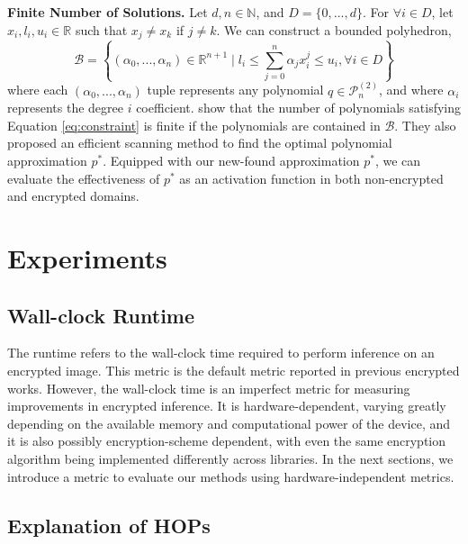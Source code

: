 \documentclass[conference]{IEEEtran}
\begin{document}
\textbf{Finite Number of Solutions.}
Let $d, n \in \mathbb{N}$, and $D = \{0,...,d\}$. For $\forall i \in D$, let $x_i, l_i, u_i \in \mathbb{R}$ such that $x_j \neq x_k$ if $j\neq k$. We can construct a bounded polyhedron,
\begin{equation*}
    \mathcal{B} = \left\{ (\alpha_0, ..., \alpha_n) \in \mathbb{R}^{n+1} \; \Bigg\vert \; l_i \leq \sum\limits_{j=0}^{n} \alpha_j x^j_i \leq u_i, \forall i \in D  \right\}
\end{equation*}
where each $(\alpha_0,...,\alpha_n)$ tuple represents any polynomial $q \in \mathcal{P}^{(2)}_n$, and where $\alpha_i$ represents the degree $i$ coefficient.
\cite{brisebarre2006computing} show that the number of polynomials satisfying Equation \ref{eq:constraint} is finite if the polynomials are contained in $\mathcal{B}$.
They also proposed an efficient scanning method to find the optimal polynomial approximation $p^*$.
Equipped with our new-found approximation $p^*$, we can evaluate the effectiveness of $p^*$ as an activation function in both non-encrypted and encrypted domains.


\section{Experiments}


\subsection{Wall-clock Runtime}
The runtime refers to the wall-clock time required to perform inference on an encrypted image.  This metric is the default metric reported in previous encrypted works.  However, the wall-clock time is an imperfect metric for measuring improvements in encrypted inference. It is hardware-dependent, varying greatly depending on the available memory and computational power of the device, and it is also possibly encryption-scheme dependent, with even the same encryption algorithm being implemented differently across libraries.  In the next sections, we introduce a metric to evaluate our methods using hardware-independent metrics.

\subsection{Explanation of HOPs}\label{sec:exp_setting}
\end{document}
